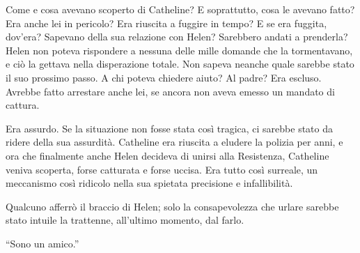 Come e cosa avevano scoperto di Catheline? E soprattutto, cosa le avevano fatto? Era anche lei in
pericolo? Era riuscita a fuggire in tempo? E se era fuggita, dov'era? Sapevano della sua relazione
con Helen? Sarebbero andati a prenderla? Helen non poteva rispondere a nessuna delle mille domande
che la tormentavano, e ciò la gettava nella disperazione totale. Non sapeva neanche quale sarebbe
stato il suo prossimo passo. A chi poteva chiedere aiuto? Al padre? Era escluso. Avrebbe fatto
arrestare anche lei, se ancora non aveva emesso un mandato di cattura.

Era assurdo. Se la situazione non fosse stata così tragica, ci sarebbe stato da ridere della sua
assurdità. Catheline era riuscita a eludere la polizia per anni, e ora che finalmente anche Helen
decideva di unirsi alla Resistenza, Catheline veniva scoperta, forse catturata e forse uccisa. Era
tutto così surreale, un meccanismo così ridicolo nella sua spietata precisione e infallibilità.

Qualcuno afferrò il braccio di Helen; solo la consapevolezza che urlare sarebbe stato intuile la
trattenne, all'ultimo momento, dal farlo.

``Sono un amico.''
